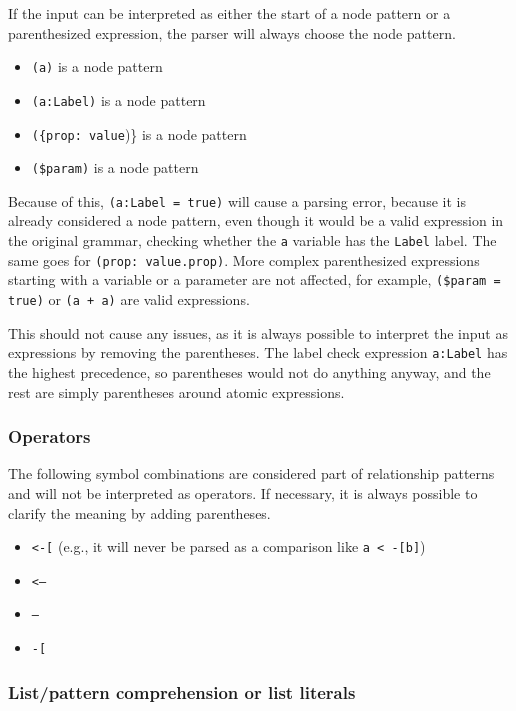 If the input can be interpreted as either the start of a node pattern or a parenthesized expression, the parser will always choose the node pattern.

\begin{itemize}
    \item \texttt{(a)} is a node pattern
    \item \texttt{(a:Label)} is a node pattern
    \item \texttt{(\{prop: value})\} is a node pattern
    \item \texttt{(\$param)} is a node pattern
\end{itemize}

Because of this, \texttt{(a:Label = true)} will cause a parsing error, because it is already considered a node pattern, even though it would be a valid expression in the original grammar, checking whether the \texttt{a} variable has the \texttt{Label} label. The same goes for \texttt{({prop: value}.prop)}. More complex parenthesized expressions starting with a variable or a parameter are not affected, for example, \texttt{(\$param = true)} or \texttt{(a + a)} are valid expressions.

This should not cause any issues, as it is always possible to interpret the input as expressions by removing the parentheses. The label check expression \texttt{a:Label} has the highest precedence, so parentheses would not do anything anyway, and the rest are simply parentheses around atomic expressions.

\subsubsection*{Operators}

The following symbol combinations are considered part of relationship patterns and will not be interpreted as operators. If necessary, it is always possible to clarify the meaning by adding parentheses.

\begin{itemize}
    \item \texttt{<-[} (e.g., it will never be parsed as a comparison like \texttt{a < -[b]})
    \item \texttt{<--}
    \item \texttt{--}
    \item \texttt{-[}
\end{itemize}

\subsubsection*{List/pattern comprehension or list literals}

